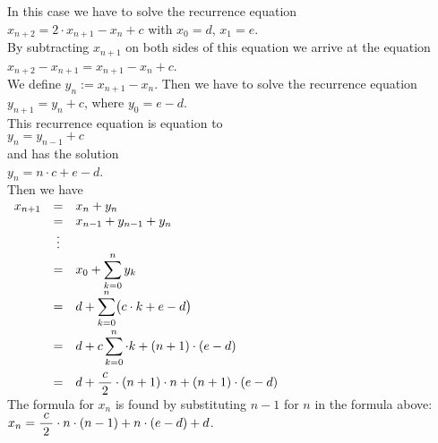 \begin{enumerate}[(a)]
      In this case we have to solve the recurrence equation
      \\[0.2cm]
      \hspace*{1.3cm}
      $x_{n+2} = 2 \cdot x_{n+1} - x_n + c$ \quad with $x_0 = d$, $x_1=e$.
      \\[0.2cm]
      By subtracting $x_{n+1}$ on both sides of this equation we arrive at the equation
      \\[0.2cm]
      \hspace*{1.3cm}
      $x_{n+2} - x_{n+1} = x_{n+1} - x_n + c$.
      \\[0.2cm]
      We define $y_{n} := x_{n+1} - x_n$.  Then we have to solve the recurrence equation
      \\[0.2cm]
      \hspace*{1.3cm}
      $y_{n+1} = y_n + c$, \quad where $y_0 = e - d$.
      \\[0.2cm]
      This recurrence equation is equation to 
      \\[0.2cm]
      \hspace*{1.3cm}
      $y_n = y_{n-1} + c$
      \\[0.2cm]
      and has the solution 
      \\[0.2cm]
      \hspace*{1.3cm}
      $y_n = n \cdot c + e - d$.
      \\[0.2cm]
      Then we have
      \\[0.2cm]
      \hspace*{1.3cm}
      $
      \begin{array}{lcl}
        x_{n+1} & = & x_n + y_n \\
               & = & x_{n-1} + y_{n-1} + y_n \\
               & \vdots & \\
               & = & \displaystyle x_0 + \sum\limits_{k=0}^n y_k \\[0.2cm]
               & = & \displaystyle d + \sum\limits_{k=0}^n \bigl(c \cdot k + e - d\bigr) \\[0.4cm]
               & = & \displaystyle d + c \sum\limits_{k=0}^n \cdot k + (n+1) \cdot (e - d) \\[0.5cm]
               & = & \displaystyle d + \frac{\;c\;}{2} \cdot (n+1) \cdot n + (n+1) \cdot (e - d) 
      \end{array}
      $
      \\[0.2cm]
      The formula for $x_n$ is found by substituting $n-1$ for $n$ in the formula above:
      \\[0.2cm]
      \hspace*{1.3cm}
      $x_n = \displaystyle \frac{\;c\;}{2} \cdot n \cdot (n-1) + n \cdot (e - d) + d$.
\end{enumerate}

